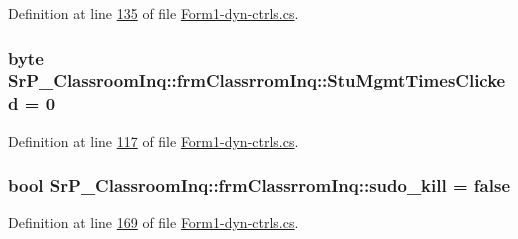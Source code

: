 \-Definition at line \hyperlink{_form1-dyn-ctrls_8cs_source_l00135}{135} of file \hyperlink{_form1-dyn-ctrls_8cs_source}{\-Form1-\/dyn-\/ctrls.\-cs}.

\hypertarget{class_sr_p___classroom_inq_1_1frm_classrrom_inq_a8746b34d859922daf9b2d5b00cef317e}{
\subsubsection[{\-Stu\-Mgmt\-Times\-Clicked}]{\setlength{\rightskip}{0pt plus 5cm}byte {\bf \-Sr\-P\-\_\-\-Classroom\-Inq\-::frm\-Classrrom\-Inq\-::\-Stu\-Mgmt\-Times\-Clicked} = 0}}
\label{class_sr_p___classroom_inq_1_1frm_classrrom_inq_a8746b34d859922daf9b2d5b00cef317e}


\-Definition at line \hyperlink{_form1-dyn-ctrls_8cs_source_l00117}{117} of file \hyperlink{_form1-dyn-ctrls_8cs_source}{\-Form1-\/dyn-\/ctrls.\-cs}.

\hypertarget{class_sr_p___classroom_inq_1_1frm_classrrom_inq_a3ac2217a30904b65be786ee00a312fea}{
\subsubsection[{sudo\-\_\-kill}]{\setlength{\rightskip}{0pt plus 5cm}bool {\bf \-Sr\-P\-\_\-\-Classroom\-Inq\-::frm\-Classrrom\-Inq\-::sudo\-\_\-kill} = false}}
\label{class_sr_p___classroom_inq_1_1frm_classrrom_inq_a3ac2217a30904b65be786ee00a312fea}


\-Definition at line \hyperlink{_form1-dyn-ctrls_8cs_source_l00169}{169} of file \hyperlink{_form1-dyn-ctrls_8cs_source}{\-Form1-\/dyn-\/ctrls.\-cs}.

